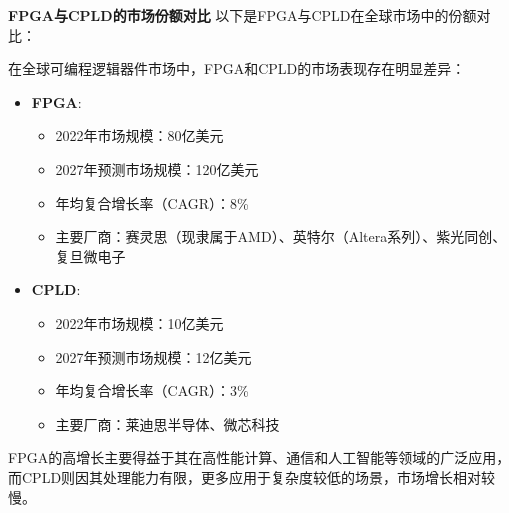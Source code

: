 \documentclass[
  ignorenonframetext,
  chinese,
]{beamer}
\providecommand{\tightlist}{%
  \setlength{\itemsep}{0pt}\setlength{\parskip}{0pt}}
\begin{document}
\begin{frame}{\textbf{FPGA与CPLD的市场份额对比}}
\label{fpgaux4e0ecpldux7684ux5e02ux573aux4efdux989dux5bf9ux6bd4}
以下是FPGA与CPLD在全球市场中的份额对比：

在全球可编程逻辑器件市场中，FPGA和CPLD的市场表现存在明显差异：

\begin{itemize}
\tightlist
\item
  \textbf{FPGA}:

  \begin{itemize}
  \tightlist
  \item
    2022年市场规模：80亿美元
  \item
    2027年预测市场规模：120亿美元
  \item
    年均复合增长率（CAGR）：8\%
  \item
    主要厂商：赛灵思（现隶属于AMD）、英特尔（Altera系列）、紫光同创、复旦微电子
  \end{itemize}
\item
  \textbf{CPLD}:

  \begin{itemize}
  \tightlist
  \item
    2022年市场规模：10亿美元
  \item
    2027年预测市场规模：12亿美元
  \item
    年均复合增长率（CAGR）：3\%
  \item
    主要厂商：莱迪思半导体、微芯科技
  \end{itemize}
\end{itemize}
\end{frame}

\begin{frame}
FPGA的高增长主要得益于其在高性能计算、通信和人工智能等领域的广泛应用，而CPLD则因其处理能力有限，更多应用于复杂度较低的场景，市场增长相对较慢。
\end{frame}
\end{document}
